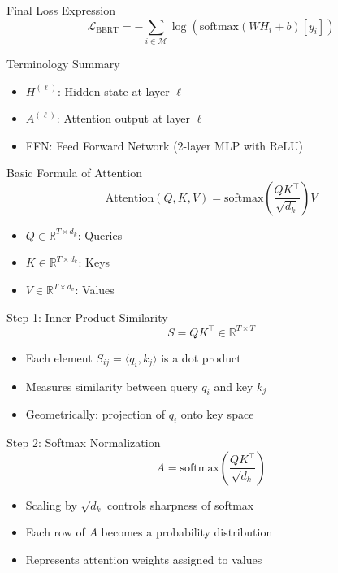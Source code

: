 \documentclass{beamer}
\begin{document}
	\begin{frame}{Final Loss Expression}
		\[
		\boxed{
			\mathcal{L}_{\text{BERT}} = - \sum_{i \in \mathcal{M}} \log \left( \text{softmax}(W H_i + b)[y_i] \right)
		}
		\]
	\end{frame}
	
	\begin{frame}{Terminology Summary}
		\begin{itemize}
			\item $H^{(\ell)}$: Hidden state at layer $\ell$
			\item $A^{(\ell)}$: Attention output at layer $\ell$
			\item FFN: Feed Forward Network (2-layer MLP with ReLU)
		\end{itemize}
	\end{frame}
	
	
	\begin{frame}{Basic Formula of Attention}
		\[
		\text{Attention}(Q, K, V) = \mathrm{softmax}\left( \frac{QK^\top}{\sqrt{d_k}} \right) V
		\]
		\begin{itemize}
			\item \( Q \in \mathbb{R}^{T \times d_k} \): Queries
			\item \( K \in \mathbb{R}^{T \times d_k} \): Keys
			\item \( V \in \mathbb{R}^{T \times d_v} \): Values
		\end{itemize}
	\end{frame}
	
	\begin{frame}{Step 1: Inner Product Similarity}
		\[
		S = QK^\top \in \mathbb{R}^{T \times T}
		\]
		\begin{itemize}
			\item Each element \( S_{ij} = \langle q_i, k_j \rangle \) is a dot product
			\item Measures similarity between query \( q_i \) and key \( k_j \)
			\item Geometrically: projection of \( q_i \) onto key space
		\end{itemize}
	\end{frame}
	
	\begin{frame}{Step 2: Softmax Normalization}
		\[
		A = \mathrm{softmax}\left( \frac{QK^\top}{\sqrt{d_k}} \right)
		\]
		\begin{itemize}
			\item Scaling by \( \sqrt{d_k} \) controls sharpness of softmax
			\item Each row of \( A \) becomes a probability distribution
			\item Represents attention weights assigned to values
		\end{itemize}
	\end{frame}
	
\end{document}

